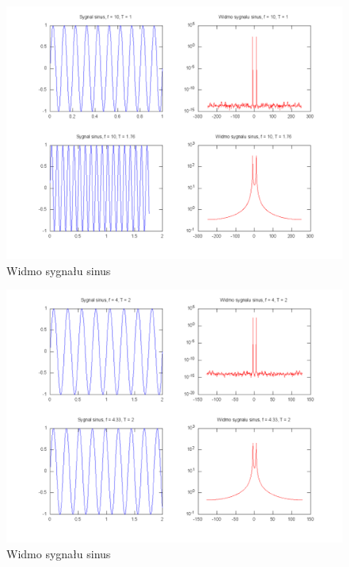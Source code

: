 \documentclass[wide,a4paper,titlepage,12pt]{mwart}
\begin{document}
		
	\begin{landscape}
	  \begin{figure}[htbp]
	    \begin{center}
	      \includegraphics[scale=.5]{out/fig1.png}
	      \caption{\label{fig1} Widmo sygnału sinus}
	    \end{center}
	  \end{figure}
	\end{landscape}
	
	\begin{landscape}
	  \begin{figure}[htbp]
	    \begin{center}
	      \includegraphics[scale=.5]{out/fig2.png}
	      \caption{\label{fig2} Widmo sygnału sinus}
	    \end{center}
	  \end{figure}
	\end{landscape}
	
\end{document}
